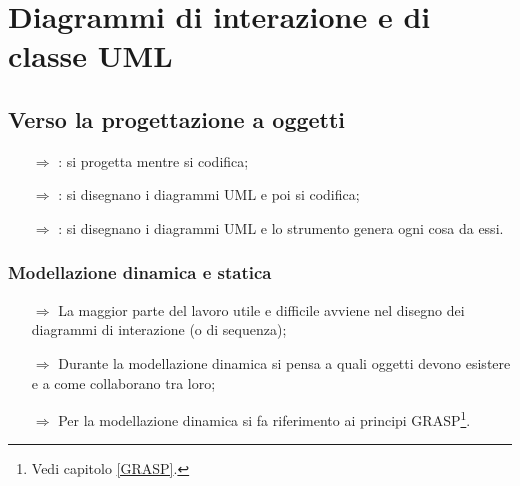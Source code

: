 \chapter{Diagrammi di interazione e di classe UML}

\section{Verso la progettazione a oggetti}


\begin{itemize}
    \item [$\Rightarrow$] : si progetta mentre
    si codifica;
    \item [$\Rightarrow$] : si
    disegnano i diagrammi UML e poi si codifica;
    \item [$\Rightarrow$] : si disegnano i
    diagrammi UML e lo strumento genera ogni cosa da essi.
\end{itemize}


\subsection{Modellazione dinamica e statica}



\pagebreak
{}

\begin{itemize}
    \item [$\Rightarrow$] La maggior parte del lavoro utile e difficile
    avviene nel disegno dei diagrammi di interazione (o di sequenza);
    \item [$\Rightarrow$] Durante la modellazione dinamica si pensa
    a quali oggetti devono esistere e a come collaborano tra loro;
    \item [$\Rightarrow$] Per la modellazione dinamica si fa riferimento
    ai principi GRASP\footnote{Vedi capitolo \ref{GRASP}.}.
\end{itemize}

